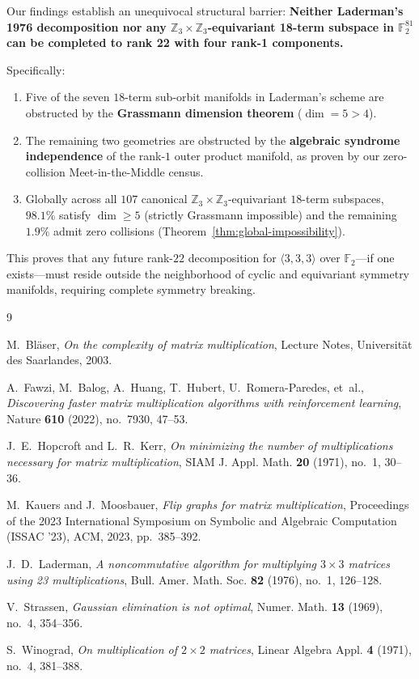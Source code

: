 \documentclass[11pt,reqno]{amsart}
\theoremstyle{plain}
\theoremstyle{definition}
\begin{document}
Our findings establish an unequivocal structural barrier: \textbf{Neither Laderman's 1976 decomposition nor any $\mathbb{Z}_3 \times \mathbb{Z}_3$-equivariant 18-term subspace in $\mathbb{F}_2^{81}$ can be completed to rank 22 with four rank-1 components.}

Specifically:
\begin{enumerate}
    \item Five of the seven $18$-term sub-orbit manifolds in Laderman's scheme are obstructed by the \textbf{Grassmann dimension theorem} ($\dim = 5 > 4$).
    \item The remaining two geometries are obstructed by the \textbf{algebraic syndrome independence} of the rank-$1$ outer product manifold, as proven by our zero-collision Meet-in-the-Middle census.
    \item Globally across all $107$ canonical $\mathbb{Z}_3 \times \mathbb{Z}_3$-equivariant $18$-term subspaces, $98.1\%$ satisfy $\dim \ge 5$ (strictly Grassmann impossible) and the remaining $1.9\%$ admit zero collisions (Theorem~\ref{thm:global-impossibility}).
\end{enumerate}

This proves that any future rank-$22$ decomposition for $\langle 3, 3, 3 \rangle$ over $\mathbb{F}_2$---if one exists---must reside outside the neighborhood of cyclic and equivariant symmetry manifolds, requiring complete symmetry breaking.

\begin{thebibliography}{9}

M.~Bl{\"a}ser, \emph{On the complexity of matrix multiplication}, Lecture Notes, Universit{\"a}t des Saarlandes, 2003.

A.~Fawzi, M.~Balog, A.~Huang, T.~Hubert, U.~Romera-Paredes, et~al.,
\emph{Discovering faster matrix multiplication algorithms with reinforcement learning},
Nature \textbf{610} (2022), no.~7930, 47--53.

J.~E.~Hopcroft and L.~R.~Kerr, \emph{On minimizing the number of multiplications necessary for matrix multiplication}, SIAM J. Appl. Math. \textbf{20} (1971), no.~1, 30--36.

M.~Kauers and J.~Moosbauer, \emph{Flip graphs for matrix multiplication}, Proceedings of the 2023 International Symposium on Symbolic and Algebraic Computation (ISSAC '23), ACM, 2023, pp.~385--392.

J.~D.~Laderman, \emph{A noncommutative algorithm for multiplying $3 \times 3$ matrices using 23 multiplications}, Bull. Amer. Math. Soc. \textbf{82} (1976), no.~1, 126--128.

V.~Strassen, \emph{Gaussian elimination is not optimal}, Numer. Math. \textbf{13} (1969), no.~4, 354--356.

S.~Winograd, \emph{On multiplication of $2 \times 2$ matrices}, Linear Algebra Appl. \textbf{4} (1971), no.~4, 381--388.

\end{thebibliography}
\end{document}
